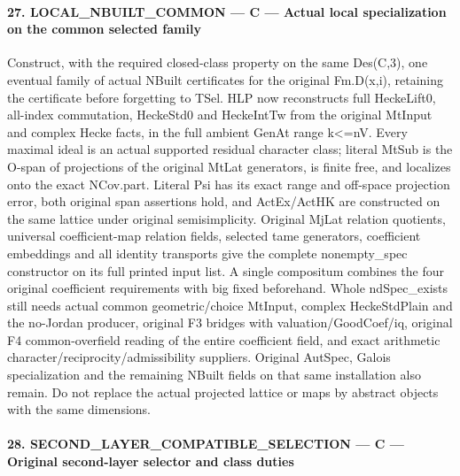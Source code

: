 \documentclass[11pt,a4paper]{article}
\numberwithin{equation}{section}
\theoremstyle{remark}\newtheorem{remark}[theorem]{Remark}
\begin{document}
\paragraph{27. LOCAL\_\allowbreak NBUILT\_\allowbreak COMMON — C — Actual local specialization on the common selected family}

Construct, with the required closed-class property on the same Des(C,3), one eventual family of actual NBuilt certificates for the original Fm.D(x,i), retaining the certificate before forgetting to TSel. HLP now reconstructs full HeckeLift0, all-index commutation, HeckeStd0 and HeckeIntTw from the original MtInput and complex Hecke facts, in the full ambient GenAt range k<=nV. Every maximal ideal is an actual supported residual character class; literal MtSub is the O-span of projections of the original MtLat generators, is finite free, and localizes onto the exact NCov.part. Literal Psi has its exact range and off-space projection error, both original span assertions hold, and ActEx/ActHK are constructed on the same lattice under original semisimplicity. Original MjLat relation quotients, universal coefficient-map relation fields, selected tame generators, coefficient embeddings and all identity transports give the complete nonempty\_\allowbreak spec constructor on its full printed input list. A single compositum combines the four original coefficient requirements with big fixed beforehand. Whole ndSpec\_\allowbreak exists still needs actual common geometric/choice MtInput, complex HeckeStdPlain and the no-Jordan producer, original F3 bridges with valuation/GoodCoef/iq, original F4 common-overfield reading of the entire coefficient field, and exact arithmetic character/reciprocity/admissibility suppliers. Original AutSpec, Galois specialization and the remaining NBuilt fields on that same installation also remain. Do not replace the actual projected lattice or maps by abstract objects with the same dimensions.



\paragraph{28. SECOND\_\allowbreak LAYER\_\allowbreak COMPATIBLE\_\allowbreak SELECTION — C — Original second-layer selector and class duties}
\end{document}
